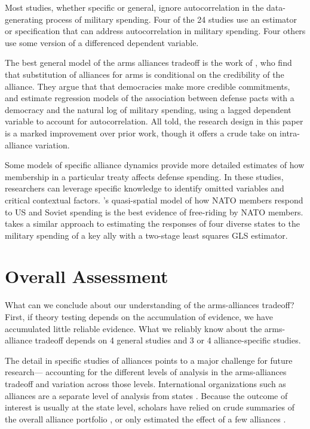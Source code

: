 \documentclass[12pt]{article}
\begin{document}
Most studies, whether specific or general, ignore autocorrelation in the data-generating process of military spending. Four of the 24 studies use an estimator or specification that can address autocorrelation in military spending. Four others use some version of a differenced dependent variable. 

The best general model of the arms alliances tradeoff is the work of \citet{DigiuseppePoast2016}, who find that substitution of alliances for arms is conditional on the credibility of the alliance. They argue that that democracies make more credible commitments, and estimate regression models of the association between defense pacts with a democracy and the natural log of military spending, using a lagged dependent variable to account for autocorrelation. All told, the research design in this paper is a marked improvement over prior work, though it offers a crude take on intra-alliance variation.  

Some models of specific alliance dynamics provide more detailed estimates of how membership in a particular treaty affects defense spending. In these studies, researchers can leverage specific knowledge to identify omitted variables and critical contextual factors. \citet{PluemperNeumayer2015}'s quasi-spatial model of how NATO members respond to US and Soviet spending is the best evidence of free-riding by NATO members. \citet{Sorokin1994} takes a similar approach to estimating the responses of four diverse states to the military spending of a key ally with a two-stage least squares GLS estimator. 



\section*{Overall Assessment}

What can we conclude about our understanding of the arms-alliances tradeoff? First, if theory testing depends on the accumulation of evidence, we have accumulated little reliable evidence. What we reliably know about the arms-alliance tradeoff depends on 4 general studies and 3 or 4 alliance-specific studies. 

The detail in specific studies of alliances points to a major challenge for future research--- accounting for the different levels of analysis in the arms-alliances tradeoff and variation across those levels. International organizations such as alliances are a separate level of analysis from states \citep{Mattes2012, Chibaetal2015}. Because the outcome of interest is usually at the state level, scholars have relied on crude summaries of the overall alliance portfolio \citep{Conybeare1992}, or only estimated the effect of a few alliances \citep{OnealWhatley1996}. 



  
% 
\end{document}
